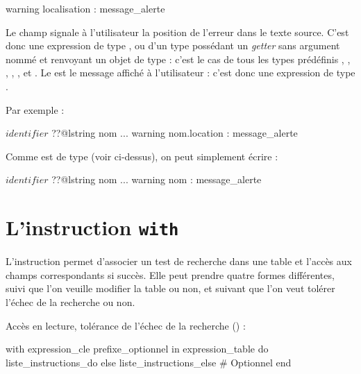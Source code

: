 {{{
\begin{galgascode}
warning localisation : message_alerte
\end{galgascode}



Le champ  signale à l'utilisateur la position de l'erreur dans le texte source. C'est donc une expression de type , ou d'un type possédant un \emph{getter} sans argument nommé  et renvoyant un objet de type  : c'est le cas de tous les types prédéfinis , , , , ,  et . Le  est le message affiché à l'utilisateur : c'est donc une expression de type .

Par exemple :

\begin{galgascode}
$identifier$ ??@lstring nom
...
warning nom.location : message_alerte
\end{galgascode}

Comme  est de type  (voir ci-dessus), on peut simplement écrire :
\begin{galgascode}
$identifier$ ??@lstring nom
...
warning nom : message_alerte
\end{galgascode}










\section{L'instruction \texttt{with}}

L'instruction  permet d'associer un test de recherche dans une table et l'accès aux champs correspondants si succès. Elle peut prendre quatre formes différentes, suivi que l'on veuille modifier la table ou non, et suivant que l'on veut tolérer l'échec de la recherche ou non.


Accès en lecture, tolérance de l'échec de la recherche () :
\begin{galgascode}
with expression_cle prefixe_optionnel in expression_table
do liste_instructions_do
else liste_instructions_else # Optionnel
end
\end{galgascode}

}}}

